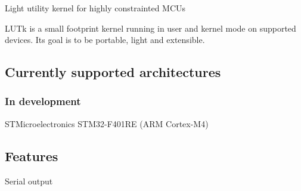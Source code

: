 Light utility kernel for highly constrainted M\+C\+Us

L\+U\+Tk is a small footprint kernel running in user and kernel mode on supported devices. Its goal is to be portable, light and extensible.

\subsection*{Currently supported architectures}

\subsubsection*{In development}


\begin{DoxyItemize}
\item S\+T\+Microelectronics S\+T\+M32-\/\+F401\+RE (A\+RM Cortex-\/\+M4)
\end{DoxyItemize}

\subsection*{Features}


\begin{DoxyItemize}
\item Serial output 
\end{DoxyItemize}